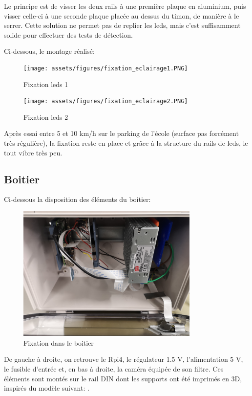 Le principe est de visser les deux rails à une première plaque en aluminium, puis visser celle-ci à une seconde plaque placée au dessus du timon,
de manière à le serrer. Cette solution ne permet pas de replier les leds, mais c'est suffisamment solide pour effectuer des tests de détection.

Ci-dessous, le montage réalisé:

\begin{figure}[H]
    \centering
    \texttt{[image: assets/figures/fixation\_eclairage1.PNG]}
    \caption{Fixation leds 1}
\end{figure}

\begin{figure}[H]
    \centering
    \texttt{[image: assets/figures/fixation\_eclairage2.PNG]}
    \caption{Fixation leds 2}
\end{figure}

Après essai entre 5 et 10 km/h sur le parking de l'école (surface pas forcément très régulière), la fixation reste en place et grâce à la structure du rails de leds, le tout vibre très peu.
\subsection{Boitier}
Ci-dessous la disposition des éléments du boitier:

\begin{figure}[H]
    \centering
    \includegraphics[width=9cm]{assets/figures/boitier_montage.jpg}
    \caption{Fixation dans le boitier}
\end{figure}

De gauche à droite, on retrouve le Rpi4, le régulateur 1.5 V, l'alimentation 5 V, le fusible d'entrée et,
en bas à droite, la caméra équipée de son filtre. Ces éléments sont montés sur le rail DIN dont les supports ont été imprimés
en 3D, inspirés du modèle suivant: \cite{support_Rpi_3D}.


